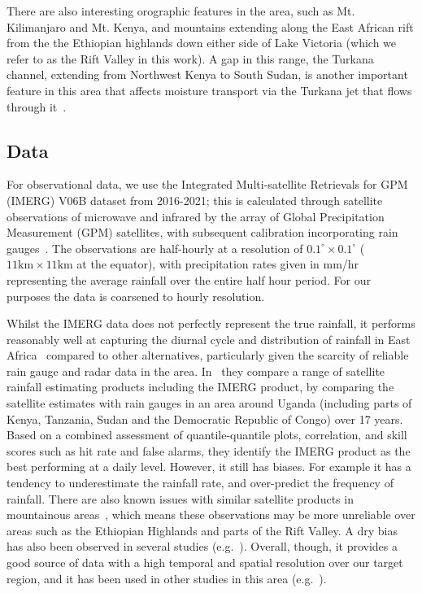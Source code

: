 \documentclass{article}
\begin{document}
There are also interesting orographic features in the area, such as Mt. Kilimanjaro and Mt. Kenya, and mountains extending along the East African rift from the the Ethiopian highlands down either side of Lake Victoria (which we refer to as the Rift Valley in this work). A gap in this range, the Turkana channel, extending from Northwest Kenya to South Sudan, is another important feature in this area that affects moisture transport via the Turkana jet that flows through it~\citep{nicholson_turkana_2016}.


\subsection{Data}

\label{sec:data}


For observational data, we use the Integrated Multi-satellite Retrievals for GPM (IMERG) V06B dataset from 2016-2021; this is calculated through satellite observations of microwave and infrared by the array of Global Precipitation Measurement (GPM) satellites, with subsequent calibration incorporating rain gauges~\citep{huffman_integrated_2023}. The observations are half-hourly at a resolution of $0.1^{\circ} \times 0.1^{\circ}$ ($11\text{km} \times 11\text{km}$ at the equator), with precipitation rates given in mm/hr representing the average rainfall over the entire half hour period. For our purposes the data is coarsened to hourly resolution.


Whilst the IMERG data does not perfectly represent the true rainfall, it performs reasonably well at capturing the diurnal cycle and distribution of rainfall in East Africa~\citep{dezfuli_validation_2017, roca_comparing_2010, camberlin_major_2018} compared to other alternatives, particularly given the scarcity of reliable rain gauge and radar data in the area.  In~\cite{ageet_validation_2022} they compare a range of satellite rainfall estimating products including the IMERG product, by comparing the satellite estimates with rain gauges in an area around Uganda (including parts of Kenya, Tanzania, Sudan and the Democratic Republic of Congo) over 17 years. Based on a combined assessment of quantile-quantile plots, correlation, and skill scores such as hit rate and false alarms, they identify the IMERG product as the best performing at a daily level. However, it still has biases. For example it has a tendency to underestimate the rainfall rate, and over-predict the frequency of rainfall. There are also known issues with similar satellite products in mountainous areas~\citep{dinku_comparison_2010}, which means these observations may be more unreliable over areas such as the Ethiopian Highlands and parts of the Rift Valley. A dry bias has also been observed in several studies (e.g.~\cite{vogel_skill_2018}). Overall, though, it provides a good source of data with a high temporal and spatial resolution over our target region, and it has been used in other studies in this area (e.g.~\cite{woodhams_what_2018, finney_implications_2019, cafaro_convection-permitting_2021}).
\end{document}
